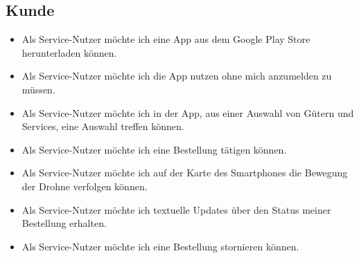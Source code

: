 \subsection{Kunde}
\begin{itemize}
\item Als Service-Nutzer möchte ich eine App aus dem Google Play Store herunterladen können.
\item Als Service-Nutzer möchte ich die App nutzen ohne mich anzumelden zu müssen.
\item Als Service-Nutzer möchte ich in der App, aus einer Auswahl von Gütern und Services, eine Auswahl treffen können.
\item Als Service-Nutzer möchte ich eine Bestellung tätigen können.
\item Als Service-Nutzer möchte ich auf der Karte des Smartphones die Bewegung der Drohne verfolgen können.
\item Als Service-Nutzer möchte ich textuelle Updates über den Status meiner Bestellung erhalten.
\item Als Service-Nutzer möchte ich eine Bestellung stornieren können.
\end{itemize}


